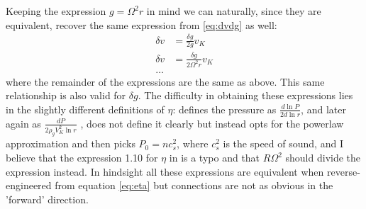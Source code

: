 \documentclass[12pt]{article}
\begin{document}
Keeping the expression $g=\Omega^2 r$ in mind we can naturally, since they are equivalent, recover the same expression from \ref{eq:dvdg} as well: 
\begin{align}
    \delta v &= \frac{\delta g}{2 g} v_K \\
    \delta v &= \frac{\delta g}{2 \Omega^2 r} v_K \\
    \dots& \nonumber
\end{align}
where the remainder of the expressions are the same as above. This same relationship is also valid for $\delta g$. The difficulty in obtaining these expressions lies in the slightly different definitions of $\eta$: \cite{LesHouches} defines the pressure as $\frac{d\ln P}{2d\ln r}$, and later again as $\frac{dP}{2\rho_gV_K^2\ln r}$ \citep{Youdin05}, \cite{Armitage07} does not define it clearly but instead opts for the powerlaw approximation and then picks $P_0=nc_s^2$, where $c_s^2$ is the speed of sound, and I believe that the expression 1.10 for $\eta$ in \cite{Nakagawa86} is a typo and that $R\Omega^2$ should divide the expression instead. In hindsight all these expressions are equivalent when reverse-engineered from equation \ref{eq:eta} but connections are not as obvious in the 'forward' direction.

\newpage


 
\end{document}

